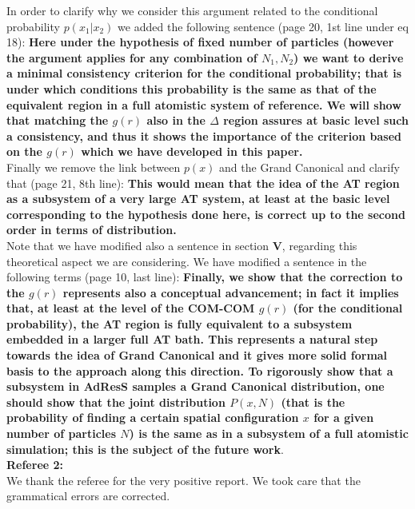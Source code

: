 \documentclass[a4paper]{article}
\begin{document}
In order to clarify why we consider this argument related to the conditional probability $p(x_{1}|x_{2})$ we added the following sentence (page 20, 1st line under eq 18): {\bf Here under the hypothesis of fixed number of particles (however the argument applies for any combination of $N_{1},N_{2}$) we want to derive a minimal consistency criterion for the conditional probability; that is under which conditions this probability is the same as that of the equivalent region in a full atomistic system of reference. We will show that matching the $g(r)$ also in the $\Delta$ region assures at basic level such a consistency, and thus it shows the importance of the criterion based on the $g(r)$ which we have developed in this paper.}\\
Finally we remove the link between $p(x)$ and the Grand Canonical and clarify that (page 21, 8th line): {\bf This would mean that the idea of the AT region as a subsystem of a very large AT system, at least at the basic level corresponding to the hypothesis done here, is correct up to the second order in terms of distribution.} 
\\
Note that we have modified also a sentence in section {\bf V}, regarding this theoretical aspect we are considering. We have modified a sentence in the following terms (page 10, last line): {\bf Finally, we show that the correction to the $g(r)$ represents also a conceptual advancement; in fact it implies that, at least at the level of the COM-COM $g(r)$ (for the conditional probability), the AT region is fully equivalent to a subsystem embedded in a larger full AT bath. This  represents a natural step towards the idea of Grand Canonical and it gives more solid formal basis to the approach along this direction. To rigorously show that a subsystem in AdResS samples a Grand Canonical distribution, one should show that the joint distribution $P(x,N)$ (that is the probability of finding a certain spatial configuration $x$ for a given number of particles $N$) is the same as in a subsystem of a full atomistic simulation; this is the subject of the future work}.\\

\vskip 1cm
\noindent
{\bf Referee 2:}\\

We thank the referee for the very positive report. We took care that the grammatical errors are corrected.\\
\end{document}
